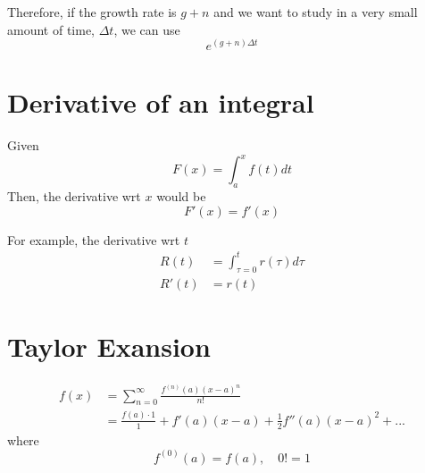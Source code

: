 \documentclass[12pt]{article}
\begin{document}
Therefore, if the growth rate is $ g + n $ and we want to study in a very small amount 
of time, $ \Delta t $, we can use
\begin{equation*}
e^{(g + n) \Delta t}
\end{equation*}



\section{Derivative of an integral}
Given
\begin{equation*}
F(x) = \int_{a}^{x} f(t)d t
\end{equation*}
Then, the derivative wrt $ x $ would be
\begin{equation*}
F'(x) = f'(x)
\end{equation*}

For example, the derivative wrt $ t $
\begin{align*}
R(t) &= \int_{\tau = 0}^{t} r(\tau)d \tau\\
R'(t)&= r(t)
\end{align*}






\section{Taylor Exansion}
\begin{align*}
f(x)&= \sum\limits_{n = 0} ^\infty \frac{f^{(n)}(a)(x - a)^{n}}{n!}\\
&= \frac{f(a)\cdot 1}{1} + f'(a)(x - a) + \frac{1}{2}f''(a)(x - a)^{2} + ...
\end{align*}
where
\begin{equation*}
f^{(0)}(a) = f(a), \quad 0! = 1
\end{equation*}
\end{document}
